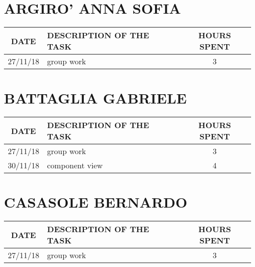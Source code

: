 \section{ARGIRO' ANNA SOFIA}
\begin{table}[h!]
\begin{tabular}{|c|p{3in}|c|}
\hline
\textbf{DATE} &\textbf{DESCRIPTION OF THE TASK} & \textbf{HOURS SPENT}\\
\hline
27/11/18 & group work & 3\\
\hline
\end{tabular}
\end{table}

\clearpage


\section{BATTAGLIA GABRIELE}
\begin{table}[h!]
	\begin{tabular}{|c|p{3in}|c|}
\hline
\textbf{DATE} &\textbf{DESCRIPTION OF THE TASK} & \textbf{HOURS SPENT}\\
\hline
27/11/18 & group work & 3\\
\hline
30/11/18 & component view & 4\\
\hline
	\end{tabular}
\end{table}

\clearpage

\section{CASASOLE BERNARDO}
\begin{table}[h!]
	\begin{tabular}{|c|p{3in}|c|}
\hline
\textbf{DATE} &\textbf{DESCRIPTION OF THE TASK} & \textbf{HOURS SPENT}\\
\hline
27/11/18 & group work & 3\\
\hline
	\end{tabular}
\end{table}